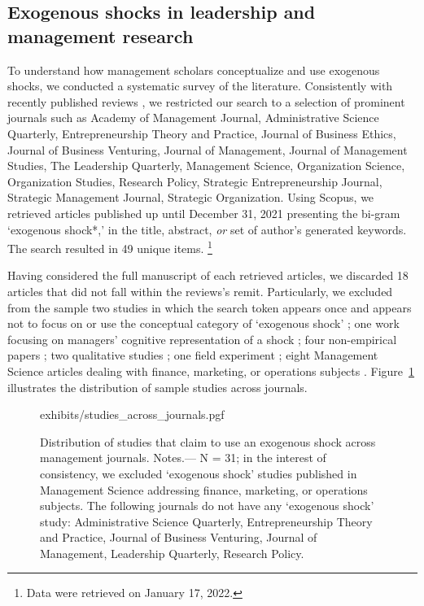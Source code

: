 \documentclass[11pt]{article}
\begin{document}
\begin{refsection}
\subsection{Exogenous shocks in leadership and management research}
\label{subsec:exogenous_shocks_in_management}

\noindent To understand how management scholars conceptualize and use
exogenous shocks, we conducted a systematic survey of the literature. 
Consistently with recently published reviews 
\autocite[e.g.,][]{gonzalez_et_al_2018,rindova_et_al_2018}, we restricted our
search to a selection of prominent journals such as Academy of Management
Journal, Administrative Science Quarterly, Entrepreneurship Theory and Practice,
Journal of Business Ethics, Journal of Business Venturing, Journal of
Management, Journal of Management Studies, The Leadership Quarterly, Management
Science, Organization Science, Organization Studies, Research Policy, Strategic
Entrepreneurship Journal, Strategic Management Journal, Strategic Organization.
Using Scopus, we retrieved articles published up until December 31, 2021
presenting the bi-gram `exogenous shock*,' in the title, abstract, \emph{or} set of
author's generated keywords. The search resulted in 49 unique items.
\footnote{Data were retrieved on January 17, 2022.}

Having considered the full manuscript of each retrieved articles, we discarded
18 articles that did not fall within the reviews's remit. Particularly, 
we excluded from the sample two studies in which the search token appears once and 
appears not to focus on or use the conceptual category of `exogenous shock'
\autocite{uzzi199735,kriauciunas2006659}; one work focusing on managers'
cognitive representation of a shock \autocite{barreto2013687}; four non-empirical papers
\autocite[e.g.,][]{mcsweeney2009933}; two qualitative studies
\autocite{glynn20051031, jenkins2010884}; one field experiment 
\autocite{cui20191216}; eight Management Science articles dealing with 
finance, marketing, or operations subjects \autocite[e.g.,][]{tham20182901}.
Figure~\ref{fig:studies_across_journals} illustrates the distribution of sample
studies across journals.

\begin{figure}[!htbp]
    \centering
    {exhibits/studies_across_journals.pgf}
    \caption{Distribution of studies that claim to use an exogenous shock across
    management journals.  Notes.--- N = 31; in the interest of consistency, we
    excluded `exogenous shock' studies published in Management Science addressing
    finance, marketing, or operations subjects. The following journals do not have any
    `exogenous shock' study: Administrative Science Quarterly, Entrepreneurship
    Theory and Practice, Journal of Business Venturing, Journal of Management,
    Leadership Quarterly, Research Policy.}
    \label{fig:studies_across_journals}
\end{figure}         


\end{refsection}
\end{document}
